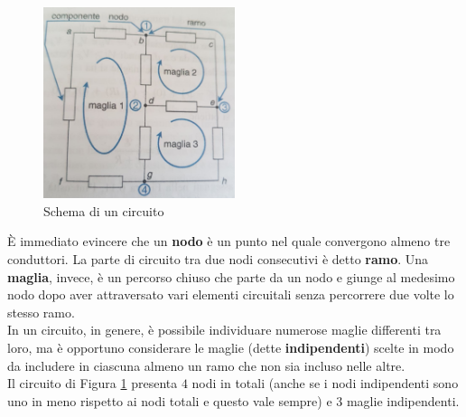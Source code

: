 \documentclass[a4paper]{extarticle}
\begin{document}
\begin{figure}[H]
  \centering
  \includegraphics[width=0.5\textwidth]{schema-circuito.png}
  \caption{Schema di un circuito}
  \label{fig:schema_circuito}
\end{figure}

\vspace{1em}
\noindent
È immediato evincere che un \textbf{nodo} è un punto nel quale convergono almeno tre conduttori. La parte di circuito tra due nodi consecutivi è detto \textbf{ramo}. Una \textbf{maglia}, invece, è un percorso chiuso che parte da un nodo e giunge al medesimo nodo dopo aver attraversato vari elementi circuitali senza percorrere due volte lo stesso ramo.\\
In un circuito, in genere, è possibile individuare numerose maglie differenti tra loro, ma è opportuno considerare le maglie (dette \textbf{indipendenti}) scelte in modo da includere in ciascuna almeno un ramo che non sia incluso nelle altre.\\
Il circuito di Figura \ref{fig:schema_circuito} presenta $4$ nodi in totali (anche se i nodi indipendenti sono uno in meno rispetto ai nodi totali e questo vale sempre) e $3$ maglie indipendenti.

\vspace{1em}
\end{document}
